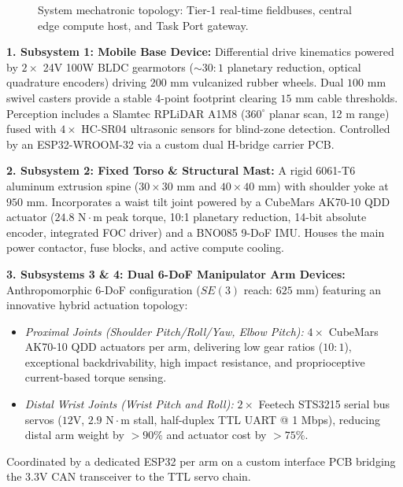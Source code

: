 \documentclass[10pt,a4paper]{article}
\begin{document}
\begin{figure}[ht]
{%
}
\vspace{-0.6em}
\caption{System mechatronic topology: Tier-1 real-time fieldbuses, central edge compute host, and Task Port gateway.}
\label{fig:mechatronic_topology}
\vspace{-0.3em}
\end{figure}

\textbf{1. Subsystem 1: Mobile Base Device:} Differential drive kinematics powered by $2\times$ 24V 100W BLDC gearmotors ($\sim 30:1$ planetary reduction, optical quadrature encoders) driving $200\text{ mm}$ vulcanized rubber wheels. Dual $100\text{ mm}$ swivel casters provide a stable 4-point footprint clearing $15\text{ mm}$ cable thresholds. Perception includes a Slamtec RPLiDAR A1M8 ($360^\circ$ planar scan, 12 m range) fused with $4\times$ HC-SR04 ultrasonic sensors for blind-zone detection. Controlled by an ESP32-WROOM-32 via a custom dual H-bridge carrier PCB.

\textbf{2. Subsystem 2: Fixed Torso \& Structural Mast:} A rigid 6061-T6 aluminum extrusion spine ($30\times 30\text{ mm}$ and $40\times 40\text{ mm}$) with shoulder yoke at $950\text{ mm}$. Incorporates a waist tilt joint powered by a CubeMars AK70-10 QDD actuator ($24.8\text{ N}\cdot\text{m}$ peak torque, 10:1 planetary reduction, 14-bit absolute encoder, integrated FOC driver) and a BNO085 9-DoF IMU. Houses the main power contactor, fuse blocks, and active compute cooling.

\textbf{3. Subsystems 3 \& 4: Dual 6-DoF Manipulator Arm Devices:} Anthropomorphic 6-DoF configuration ($SE(3)$ reach: $625\text{ mm}$) featuring an innovative hybrid actuation topology:
\begin{itemize}[leftmargin=1.2em,noitemsep,topsep=1pt]
  \item \emph{Proximal Joints (Shoulder Pitch/Roll/Yaw, Elbow Pitch):} $4\times$ CubeMars AK70-10 QDD actuators per arm, delivering low gear ratios ($10:1$), exceptional backdrivability, high impact resistance, and proprioceptive current-based torque sensing.
  \item \emph{Distal Wrist Joints (Wrist Pitch and Roll):} $2\times$ Feetech STS3215 serial bus servos ($12\text{V}$, $2.9\text{ N}\cdot\text{m}$ stall, half-duplex TTL UART @ 1 Mbps), reducing distal arm weight by $>90\%$ and actuator cost by $>75\%$.
\end{itemize}
Coordinated by a dedicated ESP32 per arm on a custom interface PCB bridging the 3.3V CAN transceiver to the TTL servo chain.
\end{document}
